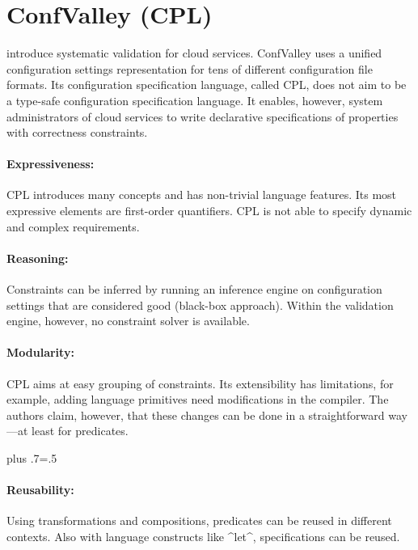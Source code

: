 \section{ConfValley (CPL)}

\citet{huang2015confvalley} introduce systematic validation for cloud services.
ConfValley uses a unified configuration settings representation for tens of different configuration file formats.
Its configuration specification language, called CPL, does not aim to be a type-safe configuration specification language.
It enables, however, system administrators of cloud services to write declarative specifications of properties with correctness constraints.

\paragraph*{Expressiveness:}
CPL introduces many concepts and has non-trivial language features.
Its most expressive elements are first-order quantifiers.
CPL is not able to specify dynamic and complex requirements.

\paragraph*{Reasoning:}
Constraints can be inferred by running an inference engine on configuration settings that are considered good (black-box approach).
Within the validation engine, however, no constraint solver is available.

\paragraph*{Modularity:}
CPL aims at easy grouping of constraints.
Its extensibility has limitations, for example, adding language primitives need modifications in the compiler.
The authors claim, however, that these changes can be done in a straightforward way---at least for predicates.%
{\parfillskip=0pt plus .7\textwidth \emergencystretch=.5\textwidth \par}

\paragraph*{Reusability:}
Using transformations and compositions, predicates can be reused in different contexts.
Also with language constructs like ^let^, specifications can be reused.




